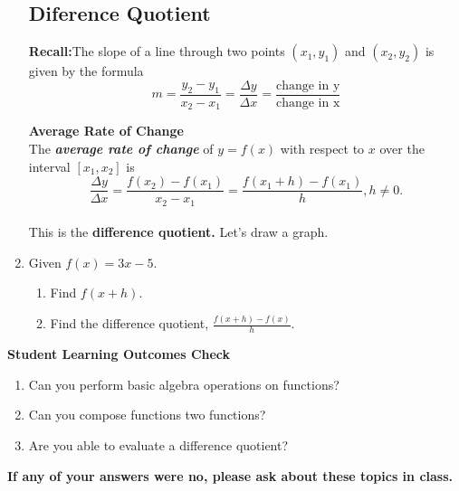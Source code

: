 \begin{enumerate}


\newpage

\subsection{Diference Quotient}

\textbf{Recall:}The slope of a line through two points $(x_1, y_1)$ and $(x_2, y_2)$ is given by the formula
$$m=\frac{y_2-y_1}{x_2-x_1}=\frac{\Delta y}{\Delta x}=\frac{\text{change in y}}{\text{change in x}}$$


\textbf{Average Rate of Change}\\


 The \textbf{\emph{average rate of change}} of $y=f(x)$ with respect to $x$ over the interval $[x_1,x_2]$ is
 $$\frac{\Delta y}{\Delta x}=\frac{f(x_2)-f(x_1)}{x_2-x_1}=\frac{f(x_1+h)-f(x_1)}{h}, h\neq 0.$$\\ 
 
 This is the \textbf{difference quotient.}  Let's draw a graph.
 \vfill
 
 \item Given $f(x)=3x-5$.
 \begin{enumerate}
 \item Find $f(x+h)$.\\[.5in]
 \item Find the difference quotient, $\frac{f(x+h)-f(x)}{h}$.\\[1.5in]
 \end{enumerate}





\end{enumerate}

\noindent \textbf{Student Learning Outcomes Check}

\begin{enumerate}
\item Can you perform basic algebra operations on functions?
\item Can you compose functions two functions?
\item Are you able to evaluate a difference quotient?


\end{enumerate}

\noindent \textbf{If any of your answers were no, please ask about these topics in class.}


